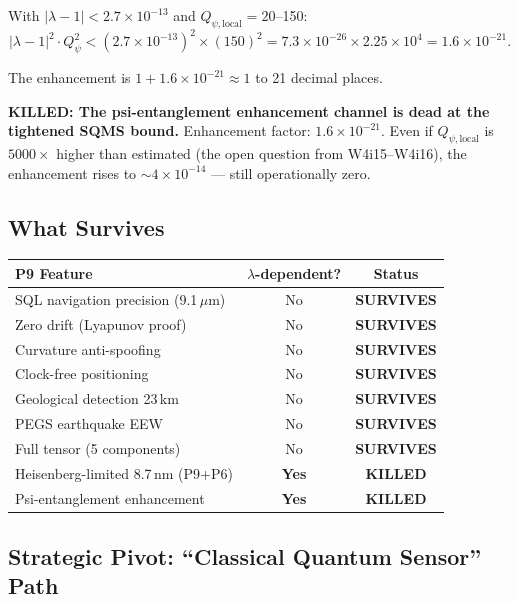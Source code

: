 \documentclass[11pt]{article}
\theoremstyle{definition}
\theoremstyle{remark}
\newcommand{\ee}[1]{\times10^{#1}}
\begin{document}
With $|\lambda - 1| < 2.7\ee{-13}$ and $Q_{\psi,\text{local}} = 20$--150:
\begin{equation}
  |\lambda - 1|^2 \cdot Q_\psi^2 < (2.7\ee{-13})^2 \times (150)^2
  = 7.3\ee{-26} \times 2.25\ee{4} = 1.6\ee{-21}.
\end{equation}

The enhancement is $1 + 1.6\ee{-21} \approx 1$ to 21 decimal places.

\begin{tcolorbox}[colback=red!5!white, colframe=red!70!black]
\textbf{KILLED: The psi-entanglement enhancement channel is dead at the
tightened SQMS bound.} Enhancement factor: $1.6\ee{-21}$. Even if
$Q_{\psi,\text{local}}$ is $5000\times$ higher than estimated (the open
question from W4i15--W4i16), the enhancement rises to
$\sim 4\ee{-14}$ --- still operationally zero.
\end{tcolorbox}

\subsection{What Survives}

\begin{center}
\begin{tabular}{lcc}
\toprule
\textbf{P9 Feature} & \textbf{$\lambda$-dependent?} & \textbf{Status} \\
\midrule
SQL navigation precision (9.1\,$\mu$m) & No & \textbf{SURVIVES} \\
Zero drift (Lyapunov proof) & No & \textbf{SURVIVES} \\
Curvature anti-spoofing & No & \textbf{SURVIVES} \\
Clock-free positioning & No & \textbf{SURVIVES} \\
Geological detection 23\,km & No & \textbf{SURVIVES} \\
PEGS earthquake EEW & No & \textbf{SURVIVES} \\
Full tensor (5 components) & No & \textbf{SURVIVES} \\
Heisenberg-limited 8.7\,nm (P9+P6) & \textbf{Yes} & \textbf{KILLED} \\
Psi-entanglement enhancement & \textbf{Yes} & \textbf{KILLED} \\
\bottomrule
\end{tabular}
\end{center}

\subsection{Strategic Pivot: ``Classical Quantum Sensor'' Path}
\end{document}
